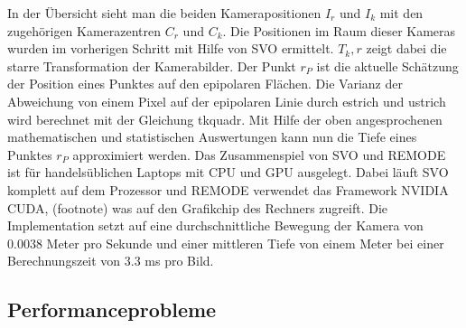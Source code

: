 In der Übersicht sieht man die beiden Kamerapositionen $I_r$ und $I_k$ mit den zugehörigen Kamerazentren $C_r$ und $C_k$. Die Positionen im Raum dieser Kameras wurden im vorherigen Schritt mit Hilfe von SVO ermittelt. $T_k,r$ zeigt dabei die starre Transformation der Kamerabilder. \newline
Der Punkt $r_P$ ist die aktuelle Schätzung der Position eines Punktes auf den epipolaren Flächen.
Die Varianz der Abweichung von einem Pixel auf der epipolaren Linie durch estrich und ustrich wird berechnet mit der Gleichung tkquadr.
Mit Hilfe der oben angesprochenen mathematischen und statistischen Auswertungen kann nun die Tiefe eines Punktes $r_P$ approximiert werden. \newline
Das Zusammenspiel von SVO und REMODE ist für handelsüblichen Laptops mit CPU und GPU ausgelegt. Dabei läuft SVO komplett auf dem Prozessor und REMODE verwendet das Framework NVIDIA CUDA, (footnote) was auf den Grafikchip des Rechners zugreift. \newline
Die Implementation setzt auf eine durchschnittliche Bewegung der Kamera von 0.0038 Meter pro Sekunde und einer mittleren Tiefe von einem Meter bei einer Berechnungszeit von 3.3 ms pro Bild. \newline



\subsection{Performanceprobleme}
\label{performanceprobleme}

